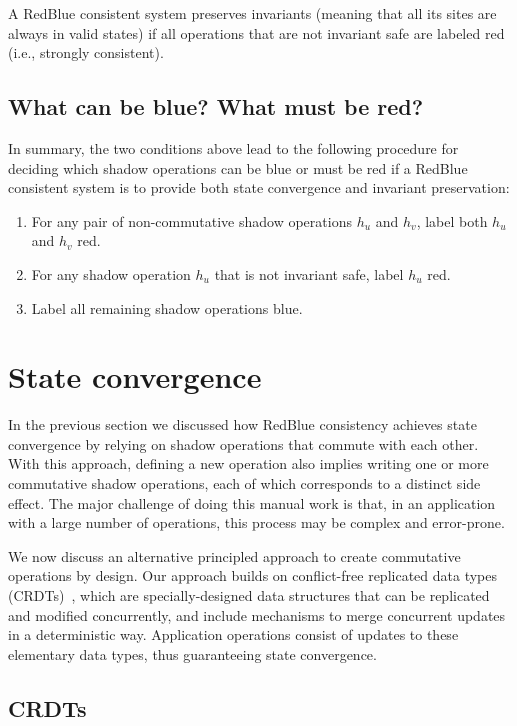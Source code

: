 \documentclass[11pt,dvipdfm]{article}
\begin{document}
\begin{theorem}
A RedBlue consistent system preserves invariants (meaning that all its sites are always in valid states) if all operations that are not invariant safe are labeled red (i.e., strongly consistent).
\end{theorem}
\fi

\subsection{What can be blue?  What must be red?}
\label{ch:redblue:sect:labelmethod}
In summary, the two conditions above lead to the following procedure for deciding
which shadow operations can be
blue or must be red if a RedBlue consistent system is to provide both
state convergence and invariant preservation:
\begin{enumerate}
\item For any pair of non-commutative shadow operations $h_u$ and $h_v$, label both $h_u$ and $h_v$ red.
\item For any shadow operation $h_u$ that is not invariant safe,
label $h_u$ red.
\item Label all remaining shadow operations blue.
\end{enumerate}

\section{State convergence}
\label{sec:crdt}
In the previous section we discussed how RedBlue consistency achieves state convergence by
relying on shadow operations that commute with each other.
With this approach, defining a new operation also implies
writing one or more commutative shadow operations, each of which corresponds to a distinct side effect.
The major challenge of doing this manual work
is that, in an application with a large number of operations, this process may be
complex and error-prone.

We now discuss an alternative principled approach to create commutative operations by design.
Our approach builds on conflict-free replicated data types (CRDTs)~\cite{crdts}, which are
specially-designed data structures that can be replicated and modified concurrently,
and include mechanisms to merge concurrent updates in a deterministic way.
Application operations consist of updates to these elementary data types, thus
guaranteeing state convergence.

\subsection{CRDTs}
\end{document}
